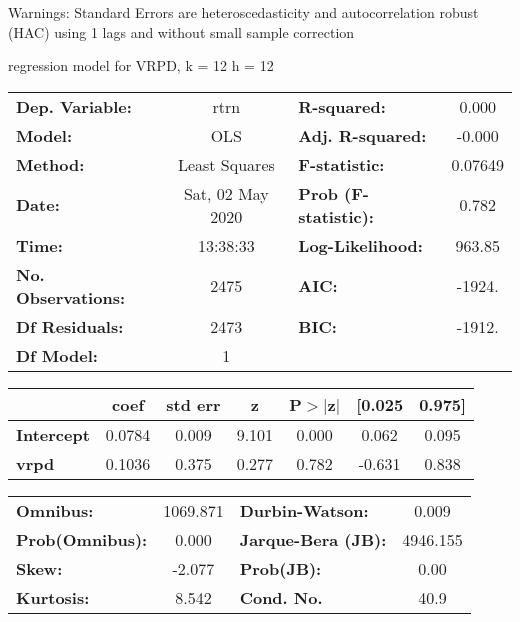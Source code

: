 Warnings: \newline
 [1] Standard Errors are heteroscedasticity and autocorrelation robust (HAC) using 1 lags and without small sample correction\ 

regression model for VRPD, k = 12 h = 12\begin{center}
\begin{tabular}{lclc}
\toprule
\textbf{Dep. Variable:}    &       rtrn       & \textbf{  R-squared:         } &     0.000   \\
\textbf{Model:}            &       OLS        & \textbf{  Adj. R-squared:    } &    -0.000   \\
\textbf{Method:}           &  Least Squares   & \textbf{  F-statistic:       } &   0.07649   \\
\textbf{Date:}             & Sat, 02 May 2020 & \textbf{  Prob (F-statistic):} &    0.782    \\
\textbf{Time:}             &     13:38:33     & \textbf{  Log-Likelihood:    } &    963.85   \\
\textbf{No. Observations:} &        2475      & \textbf{  AIC:               } &    -1924.   \\
\textbf{Df Residuals:}     &        2473      & \textbf{  BIC:               } &    -1912.   \\
\textbf{Df Model:}         &           1      & \textbf{                     } &             \\
\bottomrule
\end{tabular}
\begin{tabular}{lcccccc}
                   & \textbf{coef} & \textbf{std err} & \textbf{z} & \textbf{P$> |$z$|$} & \textbf{[0.025} & \textbf{0.975]}  \\
\midrule
\textbf{Intercept} &       0.0784  &        0.009     &     9.101  &         0.000        &        0.062    &        0.095     \\
\textbf{vrpd}      &       0.1036  &        0.375     &     0.277  &         0.782        &       -0.631    &        0.838     \\
\bottomrule
\end{tabular}
\begin{tabular}{lclc}
\textbf{Omnibus:}       & 1069.871 & \textbf{  Durbin-Watson:     } &    0.009  \\
\textbf{Prob(Omnibus):} &   0.000  & \textbf{  Jarque-Bera (JB):  } & 4946.155  \\
\textbf{Skew:}          &  -2.077  & \textbf{  Prob(JB):          } &     0.00  \\
\textbf{Kurtosis:}      &   8.542  & \textbf{  Cond. No.          } &     40.9  \\
\bottomrule
\end{tabular}
\end{center}

